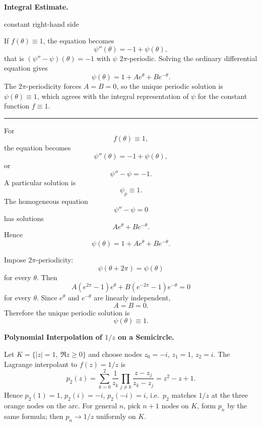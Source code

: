 \begin{problem}[CP-II-0159]
\label{prob:cp-ii-0159}
\textbf{Integral Estimate.}

\hspace*{1.5em}constant right-hand side

If $f(\theta)\equiv 1$, the equation becomes
\[
\psi''(\theta) = -1 + \psi(\theta),
\]
that is $(\psi''-\psi)(\theta)=-1$ with $\psi$ $2\pi$-periodic. Solving
the ordinary differential equation gives
\[
\psi(\theta) = 1 + A e^\theta + B e^{-\theta}.
\]
The $2\pi$-periodicity forces $A=B=0$, so the unique periodic solution is
$\psi(\theta)\equiv 1$, which agrees with the integral representation of
$\psi$ for the constant function $f\equiv1$.

\bigskip
\noindent\rule{\textwidth}{0.4pt}
\medskip
\end{problem}

\begin{solution}
For
\[
f(\theta)\equiv1,
\]
the equation becomes
\[
\psi''(\theta)
=
-1+\psi(\theta),
\]
or
\[
\psi''-\psi=-1.
\]
A particular solution is
\[
\psi_p\equiv1.
\]
The homogeneous equation
\[
\psi''-\psi=0
\]
has solutions
\[
Ae^\theta+Be^{-\theta}.
\]
Hence
\[
\psi(\theta)
=
1+Ae^\theta+Be^{-\theta}.
\]

Impose \(2\pi\)-periodicity:
\[
\psi(\theta+2\pi)=\psi(\theta)
\]
for every \(\theta\). Then
\[
A(e^{2\pi}-1)e^\theta
+
B(e^{-2\pi}-1)e^{-\theta}
=
0
\]
for every \(\theta\). Since \(e^\theta\) and \(e^{-\theta}\) are linearly independent,
\[
A=B=0.
\]
Therefore the unique periodic solution is
\[
\boxed{\psi(\theta)\equiv1.}
\]
\end{solution}


\begin{problem}[CP-II-0174]
\label{prob:cp-ii-0174}
\textbf{Polynomial Interpolation of \(1/z\) on a Semicircle.}

\hspace*{1.5em}Let $K=\{|z|=1,\ \Re z\ge0\}$ and choose nodes $z_0=-i$, $z_1=1$, $z_2=i$.
	The Lagrange interpolant to $f(z)=1/z$ is
	\[
	p_2(z)=\sum_{k=0}^2 \frac{1}{z_k}\prod_{j\ne k}\frac{z-z_j}{z_k-z_j}
	= z^2 - z + 1.
	\]
	Hence $p_2(1)=1$, $p_2(i)=-i$, $p_2(-i)=i$, i.e.\ $p_2$ matches $1/z$ at the
	three orange nodes on the arc. For general $n$, pick $n{+}1$ nodes on $K$,
	form $p_n$ by the same formula; then $p_n\to 1/z$ uniformly on $K$.
\end{problem}

